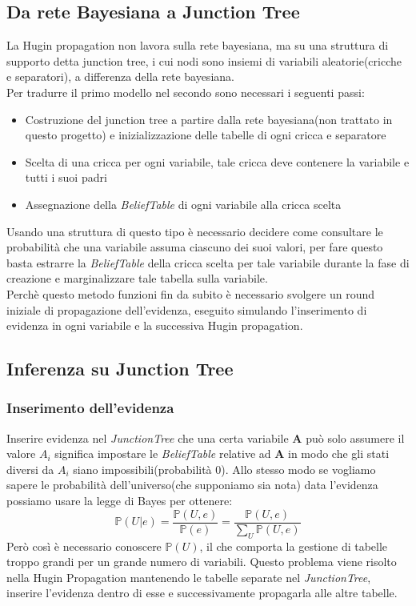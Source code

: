 \documentclass[a4paper]{article}
\begin{document}
\subsection{Da rete Bayesiana a Junction Tree}
La Hugin propagation non lavora sulla rete bayesiana, ma su una struttura di supporto detta junction tree, i cui nodi sono insiemi di variabili aleatorie(cricche e separatori), a differenza della rete bayesiana.\\ 
Per tradurre il primo modello nel secondo sono necessari i seguenti passi:
\begin{itemize}
\item Costruzione del junction tree a partire dalla rete bayesiana(non trattato in questo progetto) e inizializzazione delle tabelle di ogni cricca e separatore
\item Scelta di una cricca per ogni variabile, tale cricca deve contenere la variabile e tutti i suoi padri
\item Assegnazione della \emph{BeliefTable} di ogni variabile alla cricca scelta
\end{itemize}
Usando una struttura di questo tipo è necessario decidere come consultare le probabilità che una variabile assuma ciascuno dei suoi valori, per fare questo basta estrarre la \emph{BeliefTable} della cricca scelta per tale variabile durante la fase di creazione e marginalizzare tale tabella sulla variabile.\\
Perchè questo metodo funzioni fin da subito è necessario svolgere un round iniziale di  propagazione dell'evidenza, eseguito simulando l'inserimento di evidenza in ogni variabile e la successiva Hugin propagation.
\subsection{Inferenza su Junction Tree}
\subsubsection{Inserimento dell'evidenza}
Inserire evidenza nel \emph{JunctionTree} che una certa variabile \textbf{A} può solo assumere il valore $A_i$ significa impostare le \emph{BeliefTable} relative ad \textbf{A} in modo che gli stati diversi da $A_i$ siano impossibili(probabilità 0). Allo stesso modo se vogliamo sapere le probabilità dell'universo(che supponiamo sia nota) data l'evidenza possiamo usare la legge di Bayes per ottenere:
$$ \mathbb{P}(U|e)= \frac{\mathbb{P}(U,e)}{\mathbb{P}(e)}=\frac{\mathbb{P}(U,e)}{\sum_U \mathbb{P}(U,e)}$$
Però così è necessario conoscere $\mathbb{P}(U)$, il che comporta la gestione di tabelle troppo grandi per un grande numero di variabili. Questo problema viene risolto nella Hugin Propagation mantenendo le tabelle separate nel \emph{JunctionTree}, inserire l'evidenza dentro di esse e successivamente propagarla alle altre tabelle. 
\end{document}
